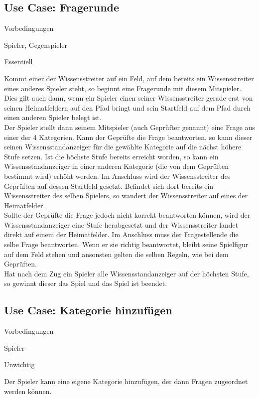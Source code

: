 \subsection{Use Case: Fragerunde}
\begin{labeling}[:]{Vorbedingungen}
\item [Akteure] Spieler, Gegenspieler
\item [Priorität] Essentiell
\item [Beschreibung] Kommt einer der Wissensstreiter auf ein Feld, auf dem bereits ein Wissensstreiter eines anderes Spieler steht, so beginnt eine Fragerunde mit diesem Mitspieler. Dies gilt auch dann, wenn ein Spieler einen seiner Wissensstreiter gerade erst von seinen Heimatfeldern auf den Pfad bringt und sein Startfeld auf dem Pfad durch einen anderen Spieler belegt ist.
\\
Der Spieler stellt dann seinem Mitspieler (auch Geprüfter genannt) eine Frage aus einer der 4 Kategorien. Kann der Geprüfte die Frage beantworten, so kann dieser seinen Wissensstandanzeiger für die gewählte Kategorie auf die nächst höhere Stufe setzen. Ist die höchste Stufe bereits erreicht worden, so kann ein Wissensstandanzeiger in einer anderen Kategorie (die von dem Geprüften bestimmt wird) erhöht werden. Im Anschluss wird der Wissensstreiter des Geprüften auf dessen Startfeld gesetzt. Befindet sich dort bereits ein Wissensstreiter des selben Spielers, so wandert der Wissensstreiter auf eines der Heimatfelder.
\\
Sollte der Geprüfte die Frage jedoch nicht korrekt beantworten können, wird der Wissensstandanzeiger eine Stufe herabgesetzt und der Wissensstreiter landet direkt auf einem der Heimatfelder. Im Anschluss muss der Fragestellende die selbe Frage beantworten. Wenn er sie richtig beantwortet, bleibt seine Spielfigur auf dem Feld stehen und ansonsten gelten die selben Regeln, wie bei dem Geprüften. \\

Hat nach dem Zug ein Spieler alle Wissensstandanzeiger auf der höchsten Stufe, so gewinnt dieser das Spiel und das Spiel ist beendet.
\item [Vorbedingungen]
\item [Offene Punkte]
\end{labeling}

\subsection{Use Case: Kategorie hinzufügen}
\begin{labeling}[:]{Vorbedingungen}
\item [Akteure] Spieler
\item [Priorität] Unwichtig
\item [Beschreibung] Der Spieler kann eine eigene Kategorie hinzufügen, der dann Fragen zugeordnet werden können.
\item [Vorbedingungen]
\item [Offene Punkte]
\end{labeling}

